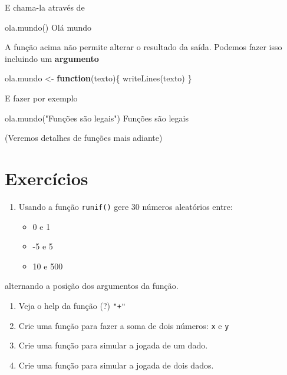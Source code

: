 \documentclass[
  10pt,
  a4paper]{book}
\newenvironment{Shaded}{\begin{snugshade}}{\end{snugshade}}
\newcommand{\ControlFlowTok}[1]{\textcolor[rgb]{0.13,0.29,0.53}{\textbf{#1}}}
\newcommand{\FunctionTok}[1]{\textcolor[rgb]{0.00,0.00,0.00}{#1}}
\newcommand{\NormalTok}[1]{#1}
\newcommand{\OtherTok}[1]{\textcolor[rgb]{0.56,0.35,0.01}{#1}}
\newcommand{\StringTok}[1]{\textcolor[rgb]{0.31,0.60,0.02}{#1}}
\providecommand{\tightlist}{%
  \setlength{\itemsep}{0pt}\setlength{\parskip}{0pt}}
\begin{document}
E chama-la através de

\begin{Shaded}
\begin{Highlighting}[]
\FunctionTok{ola.mundo}\NormalTok{()}
\NormalTok{Olá mundo}
\end{Highlighting}
\end{Shaded}

A função acima não permite alterar o resultado da saída. Podemos fazer
isso incluindo um \textbf{argumento}

\begin{Shaded}
\begin{Highlighting}[]
\NormalTok{ola.mundo }\OtherTok{\textless{}{-}} \ControlFlowTok{function}\NormalTok{(texto)\{}
    \FunctionTok{writeLines}\NormalTok{(texto)}
\NormalTok{\}}
\end{Highlighting}
\end{Shaded}

E fazer por exemplo

\begin{Shaded}
\begin{Highlighting}[]
\FunctionTok{ola.mundo}\NormalTok{(}\StringTok{"Funções são legais"}\NormalTok{)}
\NormalTok{Funções são legais}
\end{Highlighting}
\end{Shaded}

(Veremos detalhes de funções mais adiante)

\hypertarget{exercuxedcios-1}{%
\section*{Exercícios}\label{exercuxedcios-1}}


\begin{enumerate}
\def\labelenumi{\arabic{enumi}.}
\tightlist
\item
  Usando a função \texttt{runif()} gere \(30\) números aleatórios entre:

  \begin{itemize}
  \tightlist
  \item
    0 e 1
  \item
    -5 e 5
  \item
    10 e 500
  \end{itemize}
\end{enumerate}

alternando a posição dos argumentos da função.

\begin{enumerate}
\def\labelenumi{\arabic{enumi}.}
\setcounter{enumi}{1}
\tightlist
\item
  Veja o help da função (?) \texttt{"+"}
\item
  Crie uma função para fazer a soma de dois números: \texttt{x} e \texttt{y}
\item
  Crie uma função para simular a jogada de um dado.
\item
  Crie uma função para simular a jogada de dois dados.
\end{enumerate}
\end{document}
